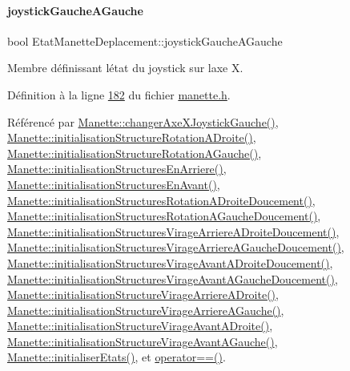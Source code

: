 \paragraph{\texorpdfstring{joystick\+Gauche\+A\+Gauche}{joystickGaucheAGauche}}
{\footnotesize\ttfamily bool Etat\+Manette\+Deplacement\+::joystick\+Gauche\+A\+Gauche}



Membre définissant l\textquotesingle{}état du joystick sur l\textquotesingle{}axe X. 



Définition à la ligne \hyperlink{manette_8h_source_l00182}{182} du fichier \hyperlink{manette_8h_source}{manette.\+h}.



Référencé par \hyperlink{manette_8cpp_source_l00421}{Manette\+::changer\+Axe\+X\+Joystick\+Gauche()}, \hyperlink{manette_8cpp_source_l00178}{Manette\+::initialisation\+Structure\+Rotation\+A\+Droite()}, \hyperlink{manette_8cpp_source_l00151}{Manette\+::initialisation\+Structure\+Rotation\+A\+Gauche()}, \hyperlink{manette_8cpp_source_l00127}{Manette\+::initialisation\+Structures\+En\+Arriere()}, \hyperlink{manette_8cpp_source_l00103}{Manette\+::initialisation\+Structures\+En\+Avant()}, \hyperlink{manette_8cpp_source_l00188}{Manette\+::initialisation\+Structures\+Rotation\+A\+Droite\+Doucement()}, \hyperlink{manette_8cpp_source_l00161}{Manette\+::initialisation\+Structures\+Rotation\+A\+Gauche\+Doucement()}, \hyperlink{manette_8cpp_source_l00296}{Manette\+::initialisation\+Structures\+Virage\+Arriere\+A\+Droite\+Doucement()}, \hyperlink{manette_8cpp_source_l00269}{Manette\+::initialisation\+Structures\+Virage\+Arriere\+A\+Gauche\+Doucement()}, \hyperlink{manette_8cpp_source_l00242}{Manette\+::initialisation\+Structures\+Virage\+Avant\+A\+Droite\+Doucement()}, \hyperlink{manette_8cpp_source_l00215}{Manette\+::initialisation\+Structures\+Virage\+Avant\+A\+Gauche\+Doucement()}, \hyperlink{manette_8cpp_source_l00286}{Manette\+::initialisation\+Structure\+Virage\+Arriere\+A\+Droite()}, \hyperlink{manette_8cpp_source_l00259}{Manette\+::initialisation\+Structure\+Virage\+Arriere\+A\+Gauche()}, \hyperlink{manette_8cpp_source_l00232}{Manette\+::initialisation\+Structure\+Virage\+Avant\+A\+Droite()}, \hyperlink{manette_8cpp_source_l00205}{Manette\+::initialisation\+Structure\+Virage\+Avant\+A\+Gauche()}, \hyperlink{manette_8cpp_source_l00023}{Manette\+::initialiser\+Etats()}, et \hyperlink{manette_8cpp_source_l00636}{operator==()}.

\mbox{\label{struct_etat_manette_deplacement_a584cf1538425c87588c5b96b79c8d482}} 
